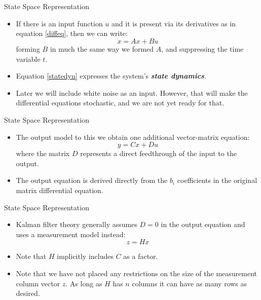 \begin{frame}
State Space Representation
 \begin{itemize}
 \item If there is an input function $u$ and it is present via its
 derivatives as in equation \eqref{diffeq}, then we can write:
\begin{equation}\label{statedyn}
  \dot{x}=Ax+Bu
\end{equation}
forming $B$ in much the same way we formed $A$, and suppressing
the time variable $t$.
 \item Equation \eqref{statedyn} expresses the system's \textit{\textbf{state dynamics}}.
 \item Later we will include white noise as an input.  However,
 that will make the differential equations stochastic, and we are not
 yet ready for that.
\end{itemize}
\end{frame}
\begin{frame}
State Space Representation
 \begin{itemize}
 \item The output model to this we obtain one
 additional vector-matrix equation:
\begin{equation}\label{measdyn1}
  y = Cx + Du
\end{equation}
where the matrix $D$ represents a direct feedthrough of the input to the output.  
\item The output equation is derived directly from the $b_i$ coefficients in the original matrix differential equation.
\end{itemize}
\end{frame}
\begin{frame}
State Space Representation
 \begin{itemize}
  \item Kalman filter theory generally assumes $D=0$ in the output equation and uses a measurement model instead:
\begin{equation}\label{measdyn2}
  z = Hx
\end{equation}
 \item Note that $H$ implicitly includes $C$ as a factor.
 \item Note that we have not placed any restrictions on the size of
 the measurement column vector $z$.  As long as $H$ has $n$ columns it can
 have as many rows as desired.
\end{itemize}
\end{frame}
